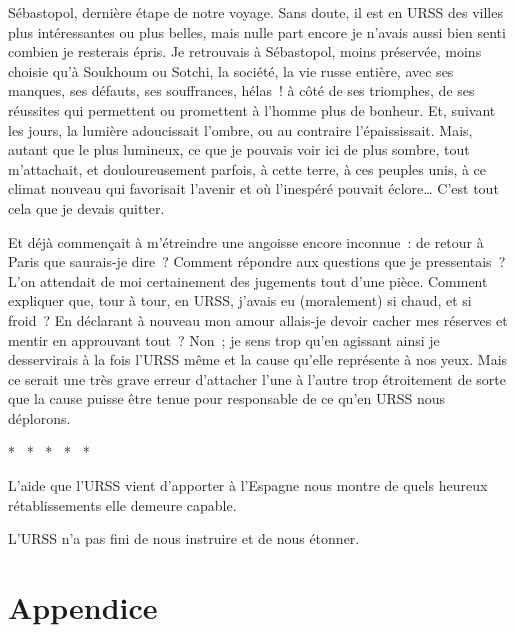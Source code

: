 \documentclass[french,twoside]{book} %
\begin{document}
\noindent Sébastopol, dernière étape de notre voyage. Sans doute, il est en URSS des villes plus intéressantes ou plus belles, mais nulle part encore je n’avais aussi bien senti combien je resterais épris. Je retrouvais à Sébastopol, moins préservée, moins choisie qu’à Soukhoum ou Sotchi, la société, la vie russe entière, avec ses manques, ses défauts, ses souffrances, hélas ! à côté de ses triomphes, de ses réussites qui permettent ou promettent à l’homme plus de bonheur. Et, suivant les jours, la lumière adoucissait l’ombre, ou au contraire l’épaississait. Mais, autant que le plus lumineux, ce que je pouvais voir ici de plus sombre, tout m’attachait, et douloureusement parfois, à cette terre, à ces peuples unis, à ce climat nouveau qui favorisait l’avenir et où l’inespéré pouvait éclore… C’est tout cela que je devais quitter.\par
Et déjà commençait à m’étreindre une angoisse encore inconnue : de retour à Paris que saurais-je dire ? Comment répondre aux questions que je pressentais ? L’on attendait de moi certainement des jugements tout d’une pièce. Comment expliquer que, tour à tour, en URSS, j’avais eu (moralement) si chaud, et si froid ? En déclarant à nouveau mon amour allais-je devoir cacher mes réserves et mentir en approuvant tout ? Non ; je sens trop qu’en agissant ainsi je desservirais à la fois l’URSS même et la cause qu’elle représente à nos yeux. Mais ce serait une très grave erreur d’attacher l’une à l’autre trop étroitement de sorte que la cause puisse être tenue pour responsable de ce qu’en URSS nous déplorons.\par

\begin{center}
\noindent \centerline{*  *  *  *  *}\par
\end{center}

\noindent L’aide que l’URSS vient d’apporter à l’Espagne nous montre de quels heureux rétablissements elle demeure capable.\par
L’URSS n’a pas fini de nous instruire et de nous étonner.
\section[{Appendice}]{Appendice}\renewcommand{\leftmark}{Appendice}
\end{document}
